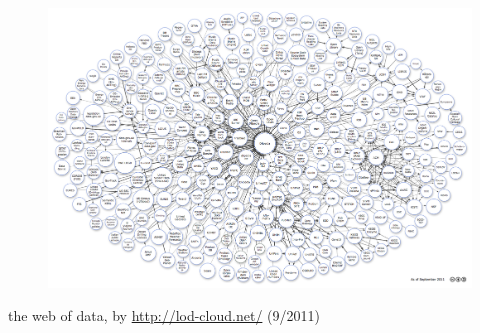 \begin{frame}\centering
\begin{figure}
\includegraphics[scale=0.17]{img/lod-cloud.png}
\end{figure}
\small the web of data, by \url{http://lod-cloud.net/} (9/2011)
\end{frame}